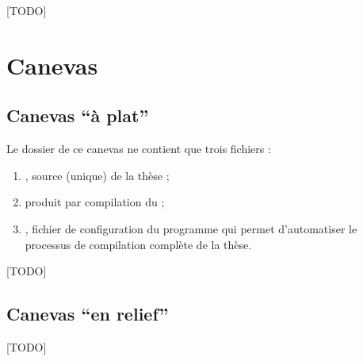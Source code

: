 [TODO]

\section{Canevas}
\label{sec:canevas}

\subsection{Canevas \enquote{à plat}}
\label{sec:canevas-a-plat}

Le dossier  de ce canevas ne contient que trois
fichiers :
\begin{enumerate}
\item {}, source  (unique) de la thèse  ;
\item {} produit par compilation du  ;
\item {}, fichier de configuration du programme 
  qui permet d'automatiser le processus de compilation complète de la thèse.
\end{enumerate}

[TODO]

\subsection{Canevas \enquote{en relief}}
\label{sec:canevas-relief}

[TODO]

%
\iffalse
\fi
